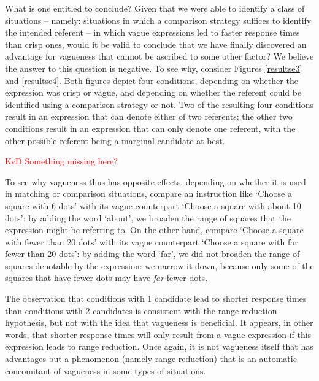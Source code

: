 \documentclass[%
man,		%
floatsintext,%
apacite%
]{apa6}
\begin{document}
What is one entitled to conclude? Given that we were able to identify a class of situations -- namely: situations in which a comparison strategy suffices to identify the intended referent -- in which vague expressions led to faster response times than crisp ones, would it be valid to conclude that we have finally discovered an advantage for vagueness that cannot be ascribed to some other factor? We believe the answer to this question is negative. To see why, consider Figures \ref{resultse3} and \ref{resultse4}. Both figures depict four conditions, depending on whether the expression was crisp or vague, and depending on whether the referent could be identified using a comparison strategy or not. Two of the resulting four conditions result in an expression that can denote either of two referents; the other two conditions result in an expression that can only denote one referent, with the other possible referent being a marginal candidate at best.

\textcolor{red}{KvD Something missing here?}

To see why vagueness thus has opposite effects, depending on whether it is used in matching or comparison situations, compare an instruction like `Choose a square with 6 dots' with its vague counterpart `Choose a square with about 10 dots': by adding the word `about', we broaden the range of squares that the expression might be referring to. On the other hand, compare `Choose a square with fewer than 20 dots' with its vague counterpart `Choose a square with far fewer than 20 dots': by adding the word `far', we did not broaden the range of squares denotable by the expression: we narrow it down, because only some of the squares that have fewer dots may have {\em far} fewer dots.

The observation that conditions with 1 candidate lead to shorter response times than conditions with 2 candidates is consistent with the range reduction hypothesis, but not with the idea that vagueness is beneficial. It appears, in other words, that %
shorter response times will only result from a vague expression if this expression leads to range reduction. Once again, it is not vagueness itself that has advantages but a phenomenon (namely range reduction) that is an automatic concomitant of vagueness in some types of situations.
\end{document}
